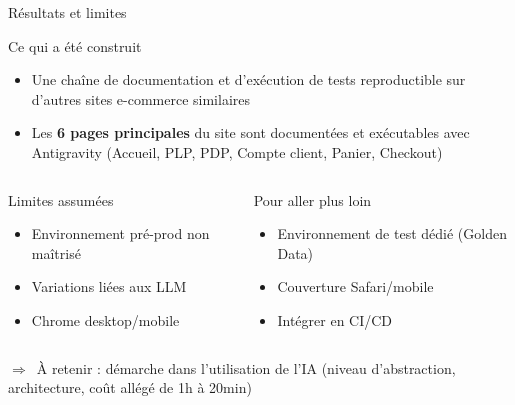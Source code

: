 \begin{frame}{Résultats et limites}
  \begin{exampleblock}{Ce qui a été construit}
    \begin{itemize}
      \item Une chaîne de documentation et d'exécution de tests reproductible sur d'autres sites e-commerce similaires
      \item Les \textbf{6 pages principales} du site sont documentées et exécutables avec Antigravity (Accueil, PLP, PDP, Compte client, Panier, Checkout)
    \end{itemize}
  \end{exampleblock}
  \vskip 1pt
  \begin{columns}[T]
    \begin{alertblock}{Limites assumées}
      \footnotesize
      \begin{itemize}
        \item Environnement pré-prod non maîtrisé
        \item Variations liées aux LLM
        \item Chrome desktop/mobile
      \end{itemize}
    \end{alertblock}
    \begin{block}{Pour aller plus loin}
      \footnotesize
      \begin{itemize}
        \item Environnement de test dédié (Golden Data)
        \item Couverture Safari/mobile
        \item Intégrer en CI/CD
      \end{itemize}
    \end{block}
  \end{columns}
  \vskip 16pt
  {\footnotesize $\Rightarrow$~À retenir : démarche dans l'utilisation de l'IA (niveau d'abstraction, architecture, coût allégé de 1h à 20min)}
\end{frame}
